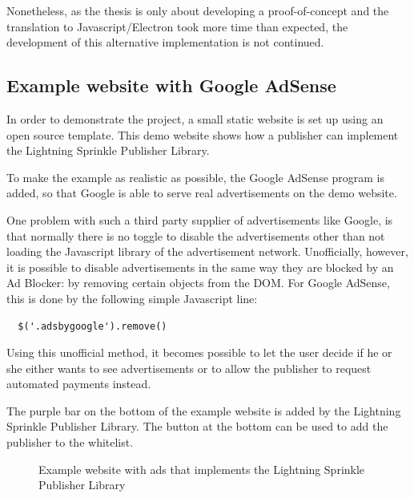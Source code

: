 Nonetheless, as the thesis is only about developing a proof-of-concept and the translation to Javascript/Electron took more time than expected, the development of this alternative implementation is not continued.

\subsection{Example website with Google AdSense}
\label{sec:examplesite}
In order to demonstrate the project, a small static website is set up using an open source template. This demo website shows how a publisher can implement the Lightning Sprinkle Publisher Library. 

To make the example as realistic as possible, the Google AdSense program is added, so that Google is able to serve real advertisements on the demo website. 

One problem with such a third party supplier of advertisements like Google, is that normally there is no toggle to disable the advertisements other than not loading the Javascript library of the advertisement network. Unofficially, however, it is possible to disable advertisements in the same way they are blocked by an Ad Blocker: by removing certain objects from the DOM. For Google AdSense, this is done by the following simple Javascript line:


\lstset{language=Javascript}
\lstset{frame=lines}
\lstset{basicstyle=\footnotesize}
\begin{lstlisting}
  $('.adsbygoogle').remove()
\end{lstlisting}

Using this unofficial method, it becomes possible to let the user decide if he or she either wants to see advertisements or to allow the publisher to request automated payments instead.

The purple bar on the bottom of the example website is added by the Lightning Sprinkle Publisher Library. The button at the bottom can be used to add the publisher to the whitelist.

\begin{figure}[h!]
  \setlength{\fboxsep}{0pt}%
  \caption{Example website with ads that implements the Lightning Sprinkle Publisher Library}
\end{figure}
